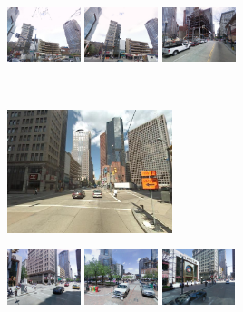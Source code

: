 \documentclass[table]{article} %
\begin{document}
\begin{figure}
\begin{minipage}{0.75\linewidth}
\begin{minipage}{\linewidth}
                \colorbox{myRed}{\includegraphics[height=16mm]{imgs/ex1/FV2}}
                \colorbox{myRed}{\includegraphics[height=16mm]{imgs/ex1/FV3}}
                \colorbox{myRed}{\includegraphics[height=16mm]{imgs/ex1/FV4}}
            \end{minipage} 
        \end{minipage}
        \\
        \begin{minipage}{0.34\linewidth}
            \centering
            \vspace{0mm}
            \includegraphics[height=36mm]{imgs/ex2/query}
        \end{minipage}
        \begin{minipage}{0.75\linewidth}
            \begin{minipage}{\linewidth} 
                \colorbox{myGreen}{\includegraphics[height=16mm]{imgs/ex2/FVsvm1}}
                \colorbox{myGreen}{\includegraphics[height=16mm]{imgs/ex2/FVsvm2}}
                \colorbox{myGreen}{\includegraphics[height=16mm]{imgs/ex2/FVsvm3}}

\end{minipage}
\end{minipage}
\end{figure}
\end{document}
